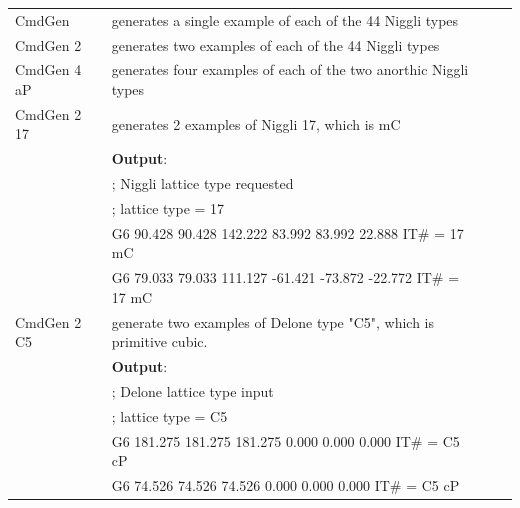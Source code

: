 \documentclass[preprint]{iucr}              %
\numberwithin{equation}{section}
\begin{document}
\begin{itemize}
\begin{table}
		
		\begin{tabular}{l l l l}
			\midrule
			CmdGen & generates a single example of each of the 44 Niggli types\\[2pt]
			CmdGen 2 & generates two examples of each of the 44 Niggli types\\[2pt]
			CmdGen 4 aP & generates four examples of each of the two anorthic Niggli types\\[2pt]
			CmdGen 2 17& generates 2 examples of Niggli 17, which is mC\\
			{}&\textbf{Output}:\\
			{}&; Niggli lattice type requested\\
			{}&; lattice type = 17\\
			{}&G6    90.428    90.428   142.222    83.992    83.992    22.888   IT\# = 17  mC\\
			{}&G6    79.033    79.033   111.127   -61.421   -73.872   -22.772   IT\# = 17  mC\\
			CmdGen 2 C5& generate two examples of Delone type "C5", which is
			primitive cubic.\\
			{}&\textbf{Output}:\\
			{}&; Delone lattice type input\\
			{}&; lattice type = C5\\
			{}&G6   181.275   181.275   181.275     0.000     0.000     0.000   IT\# = C5  cP\\
			{}&G6    74.526    74.526    74.526     0.000     0.000     0.000   IT\# = C5  cP\\[2pt]
			

\end{tabular}
\end{table}
\end{itemize}
\end{document}
